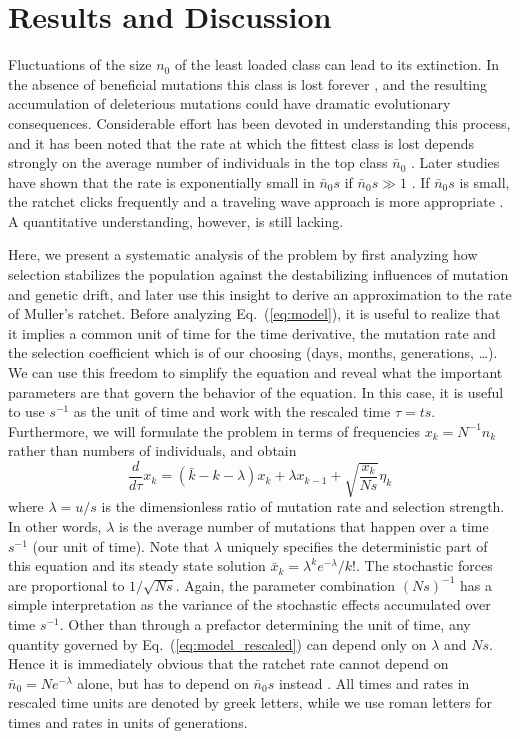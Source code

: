 \documentclass[rmp,preprint]{revtex4}
\newcommand{\EQ}[1]{Eq.~(\ref{eq:#1})}
\newcommand{\x}{x}
\newcommand{\xs}{\bar{\x}}
\newcommand{\n}{n}
\newcommand{\ns}{\bar{\n}}
\newcommand{\mut}{u}
\begin{document}
\section{Results and Discussion}
Fluctuations of the size $\n_0$ of the least loaded class can lead to its extinction. In the absence of beneficial mutations this class is lost forever \citep{Muller:1964p45018}, and the resulting accumulation of deleterious mutations could have dramatic evolutionary consequences. Considerable effort has been devoted in understanding this process, and it has been noted that the rate at which the fittest class is lost depends strongly on the average number of individuals in the top class $\ns_0$ \citep{Haigh:1978p37141}. Later studies have shown that the rate is exponentially small in $\ns_0 s$ if $\ns_0 s \gg 1$ \citep{Jain:2008p45047}. If $\ns_0 s$ is small, the ratchet clicks frequently and a traveling wave approach is more appropriate \citep{Rouzine:2008p20864}. A quantitative understanding, however, is still lacking.

Here, we present a systematic analysis of the problem by first analyzing how selection stabilizes the population against the destabilizing influences of mutation and genetic drift, and later use this insight to derive an approximation to the rate of Muller's ratchet. Before analyzing \EQ{model}, it is useful to realize that it implies a common unit of time for the time derivative, the mutation rate and the selection coefficient which is of our choosing (days, months, generations, \ldots). We can use this freedom to simplify the equation and reveal what the important parameters are that govern the behavior of the equation. In this case, it is useful to use $s^{-1}$ as the unit of time and work with the rescaled time $\tau = ts$. Furthermore, we will formulate the problem in terms of frequencies $\x_k = N^{-1}\n_k$ rather than numbers of individuals, and obtain
\begin{equation}
\label{eq:model_rescaled}
\frac{d}{d \tau}  \x_k= (\bar{k}-k-\lambda)\x_k + \lambda \x_{k-1} + \sqrt{\frac{\x_k}{Ns}}\eta_k
\end{equation}
where $\lambda = \mut/s$ is the dimensionless ratio of mutation rate and selection strength. In other words, $\lambda$ is the average number of mutations that happen over a time $s^{-1}$ (our unit of time). Note that $\lambda$ uniquely specifies the deterministic part of this equation and its steady state solution $\xs_k = \lambda^k e^{-\lambda}/k!$. The stochastic forces are proportional to $1/\sqrt{Ns}$. Again, the parameter combination $(Ns)^{-1}$ has a simple interpretation as the variance of the stochastic effects accumulated over time $s^{-1}$.
Other than through a prefactor determining the unit of time, any quantity governed by \EQ{model_rescaled} can depend only on $\lambda$ and $Ns$. Hence it is immediately obvious that the ratchet rate cannot depend on $\ns_0 = Ne^{-\lambda}$ alone, but has to depend on $\ns_0 s$ instead \citep{Jain:2008p45047}.  All times and rates in rescaled time units are denoted by greek letters, while we  use roman letters for times and rates in units of generations. 
\end{document}
